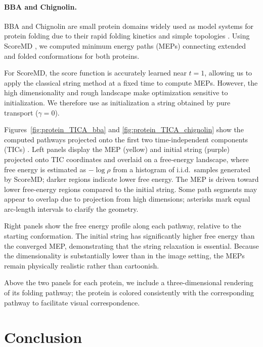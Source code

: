 \documentclass{article}
\theoremstyle{plain}
\theoremstyle{definition}
\theoremstyle{remark}
\begin{document}
\paragraph{BBA and Chignolin.} BBA and Chignolin are small protein domains widely used as model systems for protein folding due to their rapid folding kinetics and simple topologies \citep{shaw2011fastfolding}. Using ScoreMD \citep{ScoreMD2026}, we computed minimum energy paths (MEPs) connecting extended and folded conformations for both proteins.

For ScoreMD, the score function is accurately learned near $t = 1$, allowing us to apply the classical string method at a fixed time to compute MEPs. However, the high dimensionality and rough landscape make optimization sensitive to initialization. We therefore use as initialization a string obtained by pure transport ($\gamma = 0$).

Figures~\ref{fig:protein_TICA_bba} and \ref{fig:protein_TICA_chignolin} show the computed pathways projected onto the first two time-independent components (TICs) \citep{liu2008desolvation}. Left panels display the MEP (yellow) and initial string (purple) projected onto TIC coordinates and overlaid on a free-energy landscape, where free energy is estimated as $-\log \rho$ from a histogram of i.i.d.\ samples generated by ScoreMD; darker regions indicate lower free energy. The MEP is driven toward lower free-energy regions compared to the initial string. Some path segments may appear to overlap due to projection from high dimensions; asterisks mark equal arc-length intervals to clarify the geometry.

Right panels show the free energy profile along each pathway, relative to the starting conformation. The initial string has significantly higher free energy than the converged MEP, demonstrating that the string relaxation is essential. Because the dimensionality is substantially lower than in the image setting, the MEPs remain physically realistic rather than cartoonish.

Above the two panels for each protein, we include a three-dimensional rendering of its folding pathway; the protein is colored consistently with the corresponding pathway to facilitate visual correspondence.






\section{Conclusion}
\end{document}

